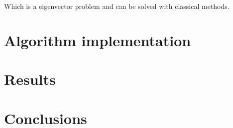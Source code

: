 \documentclass[12pt,journal]{IEEEtran}
\begin{document}
    Which is a eigenvector problem and can be solved with classical methods. 

\section{Algorithm implementation}

\cite{matlab}

\section{Results}

\section{Conclusions}



\end{document}
